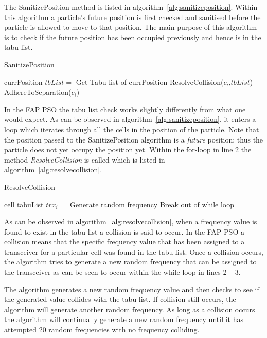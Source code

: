 The SanitizePosition method is listed in algorithm~\ref{alg:sanitizeposition}. Within this algorithm a particle's future position is first checked and sanitised before the particle is allowed to move to that position. The main purpose of this algorithm is to check if the future position has been occupied previously and hence is in the tabu list.
\begin{algorithm}[H]
\caption{SanitizePosition}
\label{alg:sanitizeposition}
\begin{algorithmic}[1]
	\Require currPosition
		\State $tbList = $ Get Tabu list of currPosition
		\State ResolveCollision($c_i$,$tbList$)
		\State AdhereToSeparation($c_i$)
	\EndFor
\end{algorithmic}
\end{algorithm}


In the \gls{FAP} \gls{PSO} the tabu list check works slightly differently from what one would expect. As can be observed in algorithm~\ref{alg:sanitizeposition}, it enters a loop which iterates through all the cells in the position of the particle. Note that the position passed to the SanitizePosition algorithm is a \emph{future} position; thus the particle does not yet occupy the position yet. Within the for-loop in line 2 the method \emph{ResolveCollision} is called which is listed in algorithm~\ref{alg:resolvecollision}.

\begin{algorithm}[H]
\caption{ResolveCollision}
\label{alg:resolvecollision}
\begin{algorithmic}[1]
	\Require cell
	\Require tabuList
				\State $trx_i = $ Generate random frequency
					\State Break out of while loop
				\EndIf
			\EndWhile
	\EndFor
\end{algorithmic}
\end{algorithm}

As can be observed in algorithm~\ref{alg:resolvecollision}, when a frequency value is found to exist in the tabu list a collision is said to occur. In the \gls{FAP} \gls{PSO} a collision means that the specific frequency value that has been assigned to a transceiver for a particular cell was found in the tabu list. Once a collision occurs, the algorithm tries to generate a new random frequency that can be assigned to the transceiver as can be seen to occur within the while-loop in lines 2 -- 3.

The algorithm generates a new random frequency value and then checks to see if the generated value collides with the tabu list. If collision still occurs, the algorithm will generate another random frequency. As long as a collision occurs the algorithm will continually generate a new random frequency until it has attempted 20 random frequencies with no frequency colliding. 

